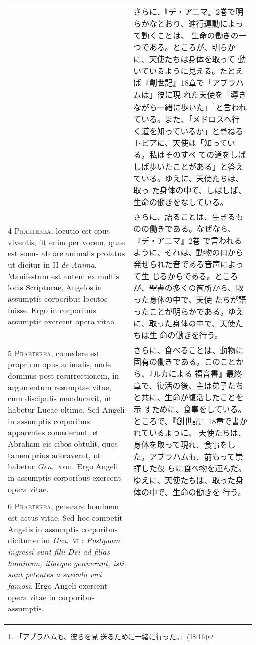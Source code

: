 \documentclass[10pt]{jsarticle} %
\begin{document}
\begin{longtable}{p{21em}p{21em}}
&
さらに、『デ・アニマ』2巻で明らかなとおり、進行運動によって動くことは、
 生命の働きの一つである。ところが、明らかに、天使たちは身体を取って
 動いているように見える。たとえば『創世記』18章で「アブラハムは」彼に現
 れた天使を「導きながら一緒に歩いた」\footnote{「アブラハムも、彼らを見
 送るために一緒に行った。」(18:16)}と言われている。また、「メドロスへ行
 く道を知っているか」と尋ねるトビアに、天使は「知っている。私はそのすべ
 ての道をしばしば歩いたことがある」と答えている。ゆえに、天使たちは、取っ
 た身体の中で、しばしば、生命の働きをなしている。

\\


{\scshape 4 Praeterea}, locutio est opus viventis, fit
enim per vocem, quae est sonus ab ore animalis prolatus ut dicitur in II
{\itshape de Anima}. Manifestum est autem ex multis locis Scripturae, Angelos in
assumptis corporibus locutos fuisse. Ergo in corporibus assumptis
exercent opera vitae.
&
さらに、語ることは、生きるものの働きである。なぜなら、『デ・アニマ』2巻
 で言われるように、それは、動物の口から発せられた音である音声によって生
 じるからである。ところが、聖書の多くの箇所から、取った身体の中で、天使
 たちが語ったことが明らかである。ゆえに、取った身体の中で、天使たちは生
 命の働きを行う。

\\



{\scshape 5 Praeterea}, comedere est proprium opus
animalis, unde dominus post resurrectionem, in argumentum resumptae
vitae, cum discipulis manducavit, ut habetur Lucae ultimo. Sed Angeli in
assumptis corporibus apparentes comederunt, et Abraham eis cibos
obtulit, quos tamen prius adoraverat, ut habetur {\itshape Gen}.~{\scshape xviii}. Ergo Angeli
in assumptis corporibus exercent opera vitae.
&
さらに、食べることは、動物に固有の働きである。このことから、『ルカによる
 福音書』最終章で、復活の後、主は弟子たちと共に、生命が復活したことを示
 すために、食事をしている。ところで、『創世記』18章で書かれているように、
 天使たちは、身体を取って現れ、食事をした。アブラハムも、前もって崇拝した彼
 らに食べ物を運んだ。ゆえに、天使たちは、取った身体の中で、生命の働きを
 行う。

\\


{\scshape 6 Praeterea}, generare hominem est actus
vitae. Sed hoc competit Angelis in assumptis corporibus dicitur enim
{\itshape Gen}.~{\scshape vi} : {\itshape Postquam ingressi sunt filii Dei ad filias hominum, illaeque
genuerunt, isti sunt potentes a saeculo viri famosi}. Ergo Angeli
exercent opera vitae in corporibus assumptis.


\end{longtable}
\end{document}
